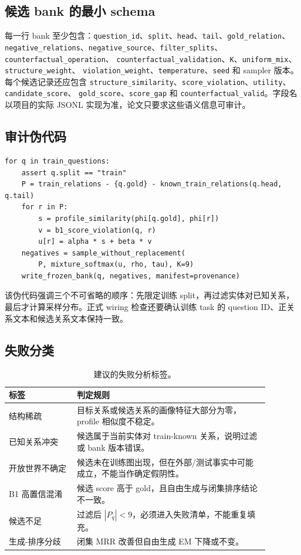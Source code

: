 \subsection{候选 bank 的最小 schema}

每一行 bank 至少包含：\texttt{question\_id}、\texttt{split}、\texttt{head}、\texttt{tail}、\texttt{gold\_relation}、
\texttt{negative\_relations}、\texttt{negative\_source}、\texttt{filter\_splits}、\texttt{counterfactual\_operation}、
\texttt{counterfactual\_validation}、\texttt{K}、\texttt{uniform\_mix}、\texttt{structure\_weight}、
\texttt{violation\_weight}、\texttt{temperature}、\texttt{seed} 和 sampler 版本。每个候选记录还应包含
\texttt{structure\_similarity}、\texttt{score\_violation}、\texttt{utility}、\texttt{candidate\_score}、
\texttt{gold\_score}、\texttt{score\_gap} 和 \texttt{counterfactual\_valid}。字段名以项目的实际 JSONL
实现为准，论文只要求这些语义信息可审计。

\subsection{审计伪代码}

\small
\begin{verbatim}
for q in train_questions:
    assert q.split == "train"
    P = train_relations - {q.gold} - known_train_relations(q.head, q.tail)
    for r in P:
        s = profile_similarity(phi[q.gold], phi[r])
        v = b1_score_violation(q, r)
        u[r] = alpha * s + beta * v
    negatives = sample_without_replacement(
        P, mixture_softmax(u, rho, tau), K=9)
    write_frozen_bank(q, negatives, manifest=provenance)
\end{verbatim}

该伪代码强调三个不可省略的顺序：先限定训练 split，再过滤实体对已知关系，最后才计算采样分布。正式 wiring 检查还要确认训练 task 的 question ID、正关系文本和候选关系文本保持一致。

\subsection{失败分类}

\begin{table}[h]
\caption{建议的失败分析标签。}
\label{tab:failure}
\centering\scriptsize
\begin{tabular}{p{0.23\linewidth}p{0.65\linewidth}}
\toprule
标签 & 判定规则 \\
\midrule
结构稀疏 & 目标关系或候选关系的画像特征大部分为零，profile 相似度不稳定。 \\
已知关系冲突 & 候选属于当前实体对 train-known 关系，说明过滤或 bank 版本错误。 \\
开放世界不确定 & 候选未在训练图出现，但在外部/测试事实中可能成立，不能当作确定假阴性。 \\
B1 高置信混淆 & 候选 score 高于 gold，且自由生成与闭集排序结论不一致。 \\
候选不足 & 过滤后 $|P_q|<9$，必须进入失败清单，不能重复填充。 \\
生成-排序分歧 & 闭集 MRR 改善但自由生成 EM 下降或不变。 \\
\bottomrule
\end{tabular}
\end{table}

